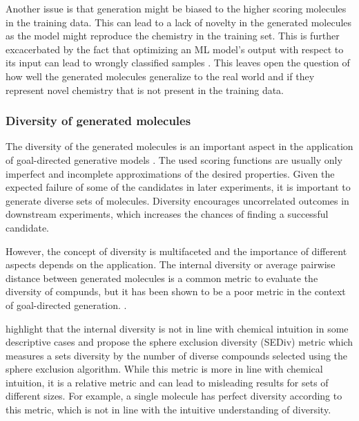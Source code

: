 Another issue is that generation might be biased to the higher scoring molecules in the training
data. This can lead to a lack of novelty in the generated molecules as the model might
reproduce the chemistry in the training set. This is further excacerbated by the fact that
optimizing an ML model's output with respect to its input can lead to wrongly
classified samples \citep{szegedyIntriguingPropertiesNeural2014,goodfellowExplainingHarnessingAdversarial2015}.
This leaves open the question of how well the generated molecules generalize to the real world and if
they represent novel chemistry that is not present in the training data.

\subsubsection{Diversity of generated molecules}
The diversity of the generated molecules is an important aspect in the application of goal-directed
generative models \citep{martinDiverseViewpointsComputational2001,gorseDiversityMedicinalChemistry2006}. The used scoring functions are usually only imperfect and incomplete
approximations of the desired properties. Given the expected failure of some of the candidates in
later experiments, it is important to generate diverse sets of molecules.
Diversity encourages uncorrelated outcomes in downstream experiments, which increases
the chances of finding a successful candidate.

However, the concept of diversity is multifaceted and the importance of different aspects depends on
the application. The internal diversity or average pairwise distance between generated molecules is
a common metric to evaluate the diversity of compunds, but it has been shown to be a poor metric in
the context of goal-directed generation.
\citep{waldmanNovelAlgorithmsOptimization2000,xieMARSMarkovMolecular2021,thomasComparisonStructureLigandbased2021}.

\citet{thomasComparisonStructureLigandbased2021} highlight that the internal diversity is not in
line with chemical intuition in some descriptive cases and propose the sphere exclusion diversity
(SEDiv) metric which measures a sets diversity by the number of diverse compounds selected using the
sphere exclusion algorithm. While this metric is more in line with chemical intuition, it is a
relative metric and can lead to misleading results for sets of different sizes. For example, a
single molecule has perfect diversity according to this metric, which is not in line with the
intuitive understanding of diversity.

